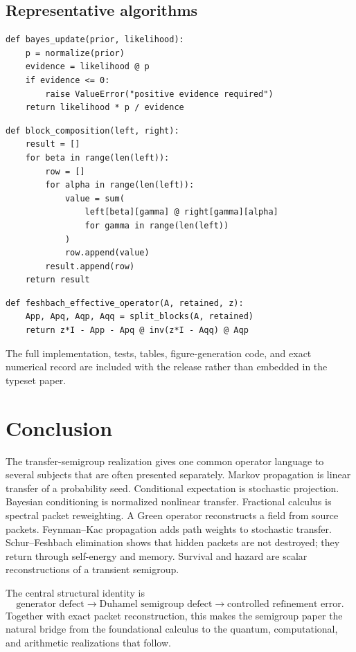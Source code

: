 \documentclass[11pt]{article}
\theoremstyle{definition}
\theoremstyle{remark}
\begin{document}
\subsection{Representative algorithms}

\begin{lstlisting}[caption={Normalized finite Bayesian update.}]
def bayes_update(prior, likelihood):
    p = normalize(prior)
    evidence = likelihood @ p
    if evidence <= 0:
        raise ValueError("positive evidence required")
    return likelihood * p / evidence
\end{lstlisting}

\begin{lstlisting}[caption={Packet block composition.}]
def block_composition(left, right):
    result = []
    for beta in range(len(left)):
        row = []
        for alpha in range(len(left)):
            value = sum(
                left[beta][gamma] @ right[gamma][alpha]
                for gamma in range(len(left))
            )
            row.append(value)
        result.append(row)
    return result
\end{lstlisting}

\begin{lstlisting}[caption={Finite Schur-Feshbach effective operator.}]
def feshbach_effective_operator(A, retained, z):
    App, Apq, Aqp, Aqq = split_blocks(A, retained)
    return z*I - App - Apq @ inv(z*I - Aqq) @ Aqp
\end{lstlisting}

The full implementation, tests, tables, figure-generation code, and exact numerical record are included with the release rather than embedded in the typeset paper.

\section{Conclusion}

The transfer-semigroup realization gives one common operator language to several subjects that are often presented separately. Markov propagation is linear transfer of a probability seed. Conditional expectation is stochastic projection. Bayesian conditioning is normalized nonlinear transfer. Fractional calculus is spectral packet reweighting. A Green operator reconstructs a field from source packets. Feynman--Kac propagation adds path weights to stochastic transfer. Schur--Feshbach elimination shows that hidden packets are not destroyed; they return through self-energy and memory. Survival and hazard are scalar reconstructions of a transient semigroup.

The central structural identity is
\[
\boxed{
\text{generator defect}
\longrightarrow
\text{Duhamel semigroup defect}
\longrightarrow
\text{controlled refinement error}.
}
\]
Together with exact packet reconstruction, this makes the semigroup paper the natural bridge from the foundational calculus to the quantum, computational, and arithmetic realizations that follow.
\end{document}

